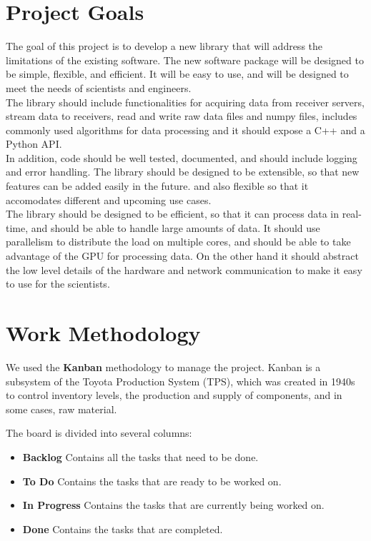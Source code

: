 \begin{spacing}{1.2}
    \section{Project Goals}
    The goal of this project is to develop a new library that will address the limitations of the existing software.
    The new software package will be designed to be simple, flexible, and efficient. It will be easy to use, and will be
    designed to meet the needs of scientists and engineers. \\

    The library should include functionalities for acquiring data from receiver servers, stream data to receivers,
    read and write raw data files and numpy files, includes commonly used algorithms for data processing and it should
    expose a C++ and a Python API. \\

    In addition, code should be well tested, documented, and should include logging and error handling.
    The library should be designed to be extensible, so that new features can be added easily in the future.
    and also flexible so that it accomodates different and upcoming use cases. \\

    The library should be designed to be efficient, so that it can process data in real-time, and should be able to handle
    large amounts of data. It should use parallelism to distribute the load on multiple cores, and should be able to
    take advantage of the GPU for processing data. On the other hand it should abstract the low level details of the
    hardware and network communication to make it easy to use for the scientists.




    \section{Work Methodology}
    We used the \textbf{Kanban} methodology to manage the project. Kanban is a subsystem of the Toyota Production System (TPS),
    which was created in 1940s to control inventory levels, the production and
    supply of components, and in some cases, raw material. \cite{junior2010variations}

    The board is divided into several columns:
    \begin{itemize}
        \item \textbf{Backlog} Contains all the tasks that need to be done.
        \item \textbf{To Do} Contains the tasks that are ready to be worked on.
        \item \textbf{In Progress} Contains the tasks that are currently being worked on.
        \item \textbf{Done} Contains the tasks that are completed.
    \end{itemize}


\end{spacing}
